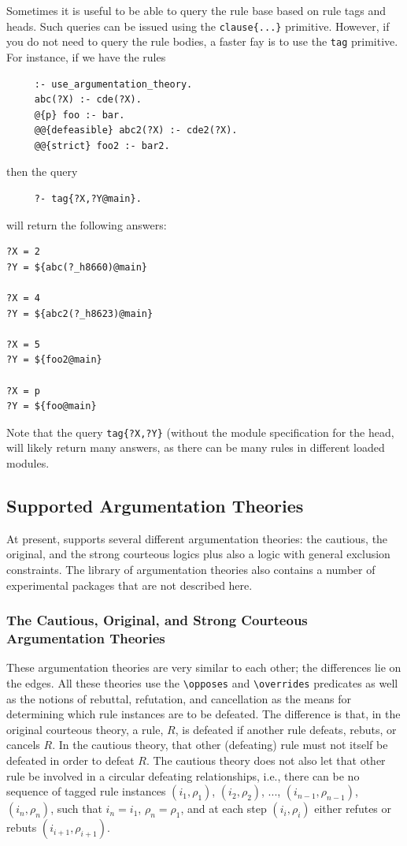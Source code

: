 \documentclass[11pt]{article}
\newcommand{\ERGO}{\mbox{\smaller{\ensuremath{\cal{E}}\smaller{{\sc{RGO}}}}}\xspace}
\newcommand{\FLSYSTEM}{\ERGO}
\newcommand{\bs}{\textbackslash}
\begin{document}
Sometimes it is useful to be able to query the rule base based on rule
tags and heads. Such queries can be issued
using the {\tt clause\{...\}} primitive. However, 
if you do not need to query the rule bodies, a faster fay is to use the
{\tt tag}  primitive. For instance, if we have
the rules
\begin{verbatim}
     :- use_argumentation_theory.
     abc(?X) :- cde(?X).
     @{p} foo :- bar.
     @@{defeasible} abc2(?X) :- cde2(?X).
     @@{strict} foo2 :- bar2.
\end{verbatim}
then the query
\begin{verbatim}
     ?- tag{?X,?Y@main}.
\end{verbatim}
will return the following answers:
\begin{verbatim}
?X = 2
?Y = ${abc(?_h8660)@main}

?X = 4
?Y = ${abc2(?_h8623)@main}

?X = 5
?Y = ${foo2@main}

?X = p
?Y = ${foo@main}
\end{verbatim}
Note that the query \texttt{tag\{?X,?Y\}} (without the module specification
for the head, will likely return many answers, as there can be many rules
in different loaded modules. 


\subsection{Supported Argumentation Theories}\label{sec-exclusion-constr}

At present, \FLSYSTEM supports several different argumentation theories: the
cautious,
the original, and the strong courteous logics plus also a
logic with general exclusion constraints. The \FLSYSTEM library of
argumentation theories also contains a number of
experimental packages that are not described here.

\subsubsection{The Cautious, Original, and Strong Courteous Argumentation Theories}

These argumentation theories are very similar to each other; the
differences lie on the edges. All these theories use the {\tt \bs{}opposes} and
{\tt \bs{}overrides} predicates as well as the notions of rebuttal,
refutation, and cancellation as the means for determining which rule
instances are to be defeated. The difference is that, in the original courteous
theory, a rule, $R$, is defeated if another rule defeats, rebuts, or
cancels $R$.
In the cautious theory, that other (defeating)
rule must not itself be defeated in order to
defeat $R$. The cautious theory does not also let that other rule be
involved in a circular defeating relationships,
i.e., there can be no sequence of
  tagged rule instances $(i_1,\rho_1)$, $(i_2,\rho_2)$, ...,
  $(i_{n-1},\rho_{n-1})$, $(i_n,\rho_n)$, such that $i_n=i_1$,
  $\rho_n=\rho_1$, and at each step $(i_i,\rho_i)$ either refutes or rebuts
  $(i_{i+1},\rho_{i+1})$.
\end{document}

